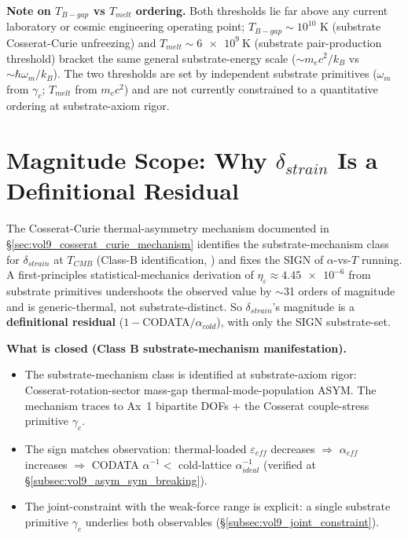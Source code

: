 \noindent
\textbf{Note on $T_{B-gap}$ vs $T_{melt}$ ordering.} Both thresholds lie far above any current laboratory or cosmic engineering operating point; $T_{B-gap} \sim 10^{10}$ K (substrate Cosserat-Curie unfreezing) and $T_{melt} \sim \qty{6e9}{\kelvin}$ (substrate pair-production threshold) bracket the same general substrate-energy scale ($\sim m_e c^2/k_B$ vs $\sim \hbar\omega_m/k_B$). The two thresholds are set by independent substrate primitives ($\omega_m$ from $\gamma_c$; $T_{melt}$ from $m_e c^2$) and are not currently constrained to a quantitative ordering at substrate-axiom rigor.

\section{Magnitude Scope: Why $\delta_{strain}$ Is a Definitional Residual}
\label{sec:vol9_temperature_open}

The Cosserat-Curie thermal-asymmetry mechanism documented in \S\ref{sec:vol9_cosserat_curie_mechanism} identifies the substrate-mechanism class for $\delta_{strain}$ at $T_{CMB}$ (Class-B identification, ) and fixes the SIGN of $\alpha$-vs-$T$ running. A first-principles statistical-mechanics derivation of $\eta_\varepsilon \approx \num{4.45e-6}$ from substrate primitives undershoots the observed value by $\sim$31 orders of magnitude and is generic-thermal, not substrate-distinct. So $\delta_{strain}$'s magnitude is a \textbf{definitional residual} ($1-$CODATA$/\alpha_{cold}$), with only the SIGN substrate-set.

\textbf{What is closed (Class B substrate-mechanism manifestation).}
\begin{itemize}
    \item The substrate-mechanism class is identified at substrate-axiom rigor: Cosserat-rotation-sector mass-gap thermal-mode-population ASYM. The mechanism traces to Ax~1 bipartite DOFs + the Cosserat couple-stress primitive $\gamma_c$.
    \item The sign matches observation: thermal-loaded $\varepsilon_{eff}$ decreases $\Rightarrow$ $\alpha_{eff}$ increases $\Rightarrow$ CODATA $\alpha^{-1} <$ cold-lattice $\alpha^{-1}_{ideal}$ (verified at \S\ref{subsec:vol9_asym_sym_breaking}).
    \item The joint-constraint with the weak-force range is explicit: a single substrate primitive $\gamma_c$ underlies both observables (\S\ref{subsec:vol9_joint_constraint}).
\end{itemize}

